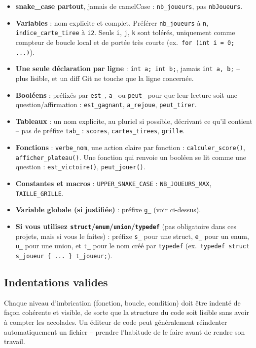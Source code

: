 \begin{itemize}
  \item \textbf{snake\_case partout}, jamais de camelCase : \texttt{nb\_joueurs}, pas \texttt{nbJoueurs}.
  \item \textbf{Variables} : nom explicite et complet. Préférer \texttt{nb\_joueurs} à \texttt{n}, \texttt{indice\_carte\_tiree} à \texttt{i2}. Seuls \texttt{i}, \texttt{j}, \texttt{k} sont tolérés, uniquement comme compteur de boucle local et de portée très courte (ex.\ \texttt{for (int i = 0; ...)}).
  \item \textbf{Une seule déclaration par ligne} : \texttt{int a; int b;}, jamais \texttt{int a, b;} -- plus lisible, et un diff Git ne touche que la ligne concernée.
  \item \textbf{Booléens} : préfixés par \texttt{est\_}, \texttt{a\_} ou \texttt{peut\_} pour que leur lecture soit une question/affirmation : \texttt{est\_gagnant}, \texttt{a\_rejoue}, \texttt{peut\_tirer}.
  \item \textbf{Tableaux} : un nom explicite, au pluriel si possible, décrivant ce qu'il contient -- pas de préfixe \texttt{tab\_} : \texttt{scores}, \texttt{cartes\_tirees}, \texttt{grille}.
  \item \textbf{Fonctions} : \texttt{verbe\_nom}, une action claire par fonction : \texttt{calculer\_score()}, \texttt{afficher\_plateau()}. Une fonction qui renvoie un booléen se lit comme une question : \texttt{est\_victoire()}, \texttt{peut\_jouer()}.
  \item \textbf{Constantes et macros} : \texttt{UPPER\_SNAKE\_CASE} : \texttt{NB\_JOUEURS\_MAX}, \texttt{TAILLE\_GRILLE}.
  \item \textbf{Variable globale (si justifiée)} : préfixe \texttt{g\_} (voir ci-dessus).
  \item \textbf{Si vous utilisez \texttt{struct}/\texttt{enum}/\texttt{union}/\texttt{typedef}} (pas obligatoire dans ces projets, mais si vous le faites) : préfixe \texttt{s\_} pour une struct, \texttt{e\_} pour un enum, \texttt{u\_} pour une union, et \texttt{t\_} pour le nom créé par \texttt{typedef} (ex.\ \texttt{typedef struct s\_joueur \{ ... \} t\_joueur;}).
\end{itemize}

\subsection*{Indentations valides}
Chaque niveau d'imbrication (fonction, boucle, condition) doit être
indenté de façon cohérente et visible, de sorte que la structure du
code soit lisible sans avoir à compter les accolades. Un éditeur de
code peut généralement réindenter automatiquement un fichier -- prendre
l'habitude de le faire avant de rendre son travail.

